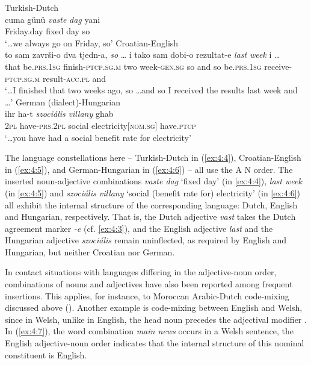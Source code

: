 \ea{\label{ex:4:4}}
Turkish-Dutch \citep[177]{backus-two-1996}\\
\gll {\dots} {cuma günü} \textit{vaste} \textit{dag} yani\\
    {} {Friday.day} fixed day so\\
\glt `\dots we always go on Friday, so' 
\ex{\label{ex:4:5}}
Croatian-English \citep[231]{hlavac-second-generation-2003}\\
\gll {\dots} to sam završi-o dva tjedn-a, \textit{so} {\dots} i tako sam dobi-o rezultat-e \textit{last} \textit{week} i {\dots}\\
	{} that be.\textsc{prs.1sg} finish-\textsc{ptcp.sg.m} two week-\textsc{gen.sg} so {} and so be.\textsc{prs.1sg} receive-\textsc{ptcp.sg.m}  result-\textsc{acc.pl} {} {} and {}\\
\glt `\dots I finished that two weeks ago, so \dots and so I received the results last week and \dots'
\ex{\label{ex:4:6}}
German (dialect)-Hungarian \citep[373]{szabo-language-2010}\\
\gll {\dots} ihr ha-t \textit{szociális} \textit{villany} ghab\\
	{} \textsc{2pl} have-\textsc{prs.2pl} social electricity[\textsc{nom.sg}] have.\textsc{ptcp}\\
\glt `\dots you have had a social benefit rate for electricity'
\z

\noindent The language constellations here -- Turkish-Dutch in (\ref{ex:4:4}), Croatian-English in (\ref{ex:4:5}), and German-Hungarian in (\ref{ex:4:6}) -- all use the A N order. The inserted noun-adjective combinations \textit{vaste dag} `fixed day' (in \ref{ex:4:4}), \textit{last week} (in \ref{ex:4:5}) and \textit{szociális villany} `social (benefit rate for) electricity' (in \ref{ex:4:6}) all exhibit the internal structure of the corresponding language: Dutch, English and Hungarian, respectively. That is, the Dutch adjective \textit{vast} takes the Dutch agreement marker \textit{-e} (cf. \ref{ex:4:3}), and the English adjective \textit{last} and the Hungarian adjective \textit{szociális} remain uninflected, as required by English and Hungarian, but neither Croatian nor German.

In contact situations with languages differing in the adjective-noun order, combinations of nouns and adjectives have also been reported among frequent insertions. This applies, for instance, to Moroccan Arabic-Dutch code-mixing discussed above (). Another example is code-mixing between English and Welsh, since in Welsh, unlike in English, the head noun precedes the adjectival modifier \citep[cf.][260]{deuchar-congruence-2005}. In (\ref{ex:4:7}), the word combination \textit{main news} occurs in a Welsh sentence, the English adjective-noun order indicates that the internal structure of this nominal constituent is English.

